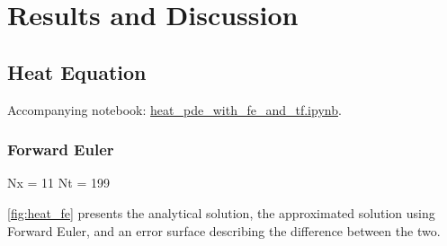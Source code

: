 \section{Results and Discussion}\label{sec:Results}

\subsection{Heat Equation}\label{sec:heateq results}
Accompanying notebook: \href{https://github.com/nicolossus/FYS-STK4155-Project3/blob/master/notebooks/heat_pde_with_fe_and_tf.ipynb}{heat\_pde\_with\_fe\_and\_tf.ipynb}.

\subsubsection{Forward Euler}
Nx = 11
Nt = 199

\autoref{fig:heat_fe} presents the analytical solution, the approximated solution using Forward Euler, and an error surface describing the difference between the two.

